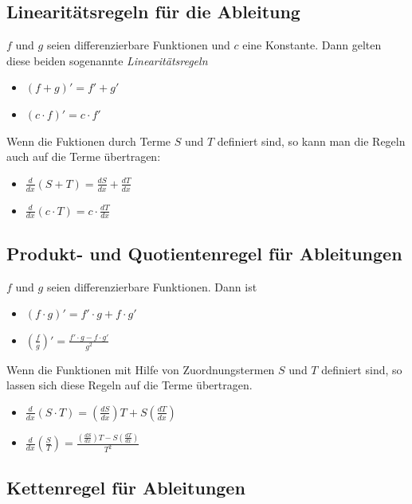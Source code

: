 \documentclass[10pt,a4paper]{article}
\begin{document}
\subsection{Linearitätsregeln für die Ableitung}

$f$ und $g$ seien differenzierbare Funktionen und $c$ eine Konstante. Dann gelten
diese beiden sogenannte \textit{Linearitätsregeln}
\begin{itemize}
	\item $(f + g)' = f' + g'$
	\item $(c \cdot f)' = c \cdot f'$
\end{itemize}

Wenn die Fuktionen durch Terme $S$ und $T$ definiert sind, so kann man die Regeln auch auf die Terme übertragen:
\begin{itemize}
	\item $\displaystyle\frac{d}{dx}(S + T) = \frac{dS}{dx} + \frac{dT}{dx}$
	\item $\displaystyle\frac{d}{dx}(c \cdot T) = c \cdot \frac{dT}{dx}$
\end{itemize}


\subsection{Produkt- und Quotientenregel für Ableitungen}

$f$ und $g$ seien differenzierbare Funktionen. Dann ist
\begin{itemize}
	\item $\displaystyle(f \cdot g)' = f' \cdot g + f \cdot g'$
	\item $\displaystyle\left(\frac{f}{g}\right)' = \frac{f' \cdot g - f \cdot g'}{g^2}$
\end{itemize}

Wenn die Funktionen mit Hilfe von Zuordnungstermen $S$ und $T$ definiert sind, so lassen sich diese Regeln auf die Terme übertragen.
\begin{itemize}
	\item $\displaystyle\frac{d}{dx}(S \cdot T) = \left(\frac{dS}{dx}\right)T + S\left(\frac{dT}{dx}\right)$
	\item $\displaystyle\frac{d}{dx}\left(\frac{S}{T}\right) = \frac{\displaystyle\left(\frac{dS}{dx}\right)T - S\left(\frac{dT}{dx}\right)}{T^2}$
\end{itemize}


\subsection{Kettenregel für Ableitungen}
\end{document}

